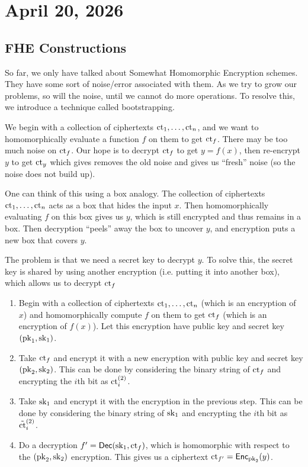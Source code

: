 \section{April 20, 2026}
\label{20260420}

\subsection{FHE Constructions}

So far, we only have talked about Somewhat Homomorphic Encryption schemes. They have some sort of noise/error associated with them. As we try to grow our problems, so will the noise, until we cannot do more operations. To resolve this, we introduce a technique called bootstrapping.

We begin with a collection of ciphertexts $\mathrm{ct}_1, \dots, \mathrm{ct}_n$, and we want to homomorphically evaluate a function $f$ on them to get $\mathrm{ct}_f$. There may be too much noise on $\mathrm{ct}_f$. Our hope is to decrypt $\mathrm{ct}_f$ to get $y= f(x)$, then re-encrypt $y$ to get $\mathrm{ct}_y$ which gives removes the old noise and gives us ``fresh'' noise (so the noise does not build up).

\begin{center}
    \def\svgwidth{0.55\columnwidth}
    
\end{center}

One can think of this using a box analogy. The collection of ciphertexts $\mathrm{ct}_1, \dots, \mathrm{ct}_n$ acts as a box that hides the input $x$. Then homomorphically evaluating $f$ on this box gives us $y$, which is still encrypted and thus remains in a box. Then decryption ``peels'' away the box to uncover $y$, and encryption puts a new box that covers $y$.

The problem is that we need a secret key to decrypt $y$. To solve this, the secret key is shared by using another encryption (i.e. putting it into another box), which allows us to decrypt $\mathrm{ct}_f$

\begin{enumerate}
    \item[Step 1.] Begin with a collection of ciphertexts $\mathrm{ct}_1, \dots, \mathrm{ct}_n$ (which is an encryption of $x$) and homomorphically compute $f$ on them to get $\mathrm{ct}_f$ (which is an encryption of $f(x)$). Let this encryption have public key and secret key $(\mathrm{pk}_1, \mathrm{sk}_1)$.
    \item[Step 2.] Take $\mathrm{ct}_f$ and encrypt it with a new encryption with public key and secret key $(\mathrm{pk}_2, \mathrm{sk}_2)$. This can be done by considering the binary string of $\mathrm{ct}_f$ and encrypting the $i$th bit as $\mathrm{ct}_i^{(2)}$.
    \item[Step 3.] Take $\mathrm{sk}_1$ and encrypt it with the encryption in the previous step. This can be done by considering the binary string of $\mathrm{sk}_1$ and encrypting the $i$th bit as $\tilde{\mathrm{ct}}_i^{(2)}$.
    \item[Step 4.] Do a decryption $f' = \operatorname{\mathsf{Dec}}(\mathrm{sk}_1, \mathrm{ct}_f)$, which is homomorphic with respect to the $(\mathrm{pk}_2, \mathrm{sk}_2)$ encryption. This gives us a ciphertext $\mathrm{ct}_{f'} = \operatorname{\mathsf{Enc}}_{\mathrm{pk}_2}(y)$.
\end{enumerate}


